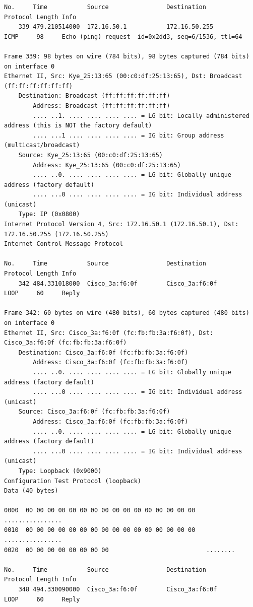 \documentclass[a4paper,11pt]{article}
\begin{document}
\begin{lstlisting}
No.     Time           Source                Destination           Protocol Length Info
    339 479.210514000  172.16.50.1           172.16.50.255         ICMP     98     Echo (ping) request  id=0x2dd3, seq=6/1536, ttl=64

Frame 339: 98 bytes on wire (784 bits), 98 bytes captured (784 bits) on interface 0
Ethernet II, Src: Kye_25:13:65 (00:c0:df:25:13:65), Dst: Broadcast (ff:ff:ff:ff:ff:ff)
    Destination: Broadcast (ff:ff:ff:ff:ff:ff)
        Address: Broadcast (ff:ff:ff:ff:ff:ff)
        .... ..1. .... .... .... .... = LG bit: Locally administered address (this is NOT the factory default)
        .... ...1 .... .... .... .... = IG bit: Group address (multicast/broadcast)
    Source: Kye_25:13:65 (00:c0:df:25:13:65)
        Address: Kye_25:13:65 (00:c0:df:25:13:65)
        .... ..0. .... .... .... .... = LG bit: Globally unique address (factory default)
        .... ...0 .... .... .... .... = IG bit: Individual address (unicast)
    Type: IP (0x0800)
Internet Protocol Version 4, Src: 172.16.50.1 (172.16.50.1), Dst: 172.16.50.255 (172.16.50.255)
Internet Control Message Protocol

No.     Time           Source                Destination           Protocol Length Info
    342 484.331018000  Cisco_3a:f6:0f        Cisco_3a:f6:0f        LOOP     60     Reply

Frame 342: 60 bytes on wire (480 bits), 60 bytes captured (480 bits) on interface 0
Ethernet II, Src: Cisco_3a:f6:0f (fc:fb:fb:3a:f6:0f), Dst: Cisco_3a:f6:0f (fc:fb:fb:3a:f6:0f)
    Destination: Cisco_3a:f6:0f (fc:fb:fb:3a:f6:0f)
        Address: Cisco_3a:f6:0f (fc:fb:fb:3a:f6:0f)
        .... ..0. .... .... .... .... = LG bit: Globally unique address (factory default)
        .... ...0 .... .... .... .... = IG bit: Individual address (unicast)
    Source: Cisco_3a:f6:0f (fc:fb:fb:3a:f6:0f)
        Address: Cisco_3a:f6:0f (fc:fb:fb:3a:f6:0f)
        .... ..0. .... .... .... .... = LG bit: Globally unique address (factory default)
        .... ...0 .... .... .... .... = IG bit: Individual address (unicast)
    Type: Loopback (0x9000)
Configuration Test Protocol (loopback)
Data (40 bytes)

0000  00 00 00 00 00 00 00 00 00 00 00 00 00 00 00 00   ................
0010  00 00 00 00 00 00 00 00 00 00 00 00 00 00 00 00   ................
0020  00 00 00 00 00 00 00 00                           ........

No.     Time           Source                Destination           Protocol Length Info
    348 494.330090000  Cisco_3a:f6:0f        Cisco_3a:f6:0f        LOOP     60     Reply


\end{lstlisting}
\end{document}
